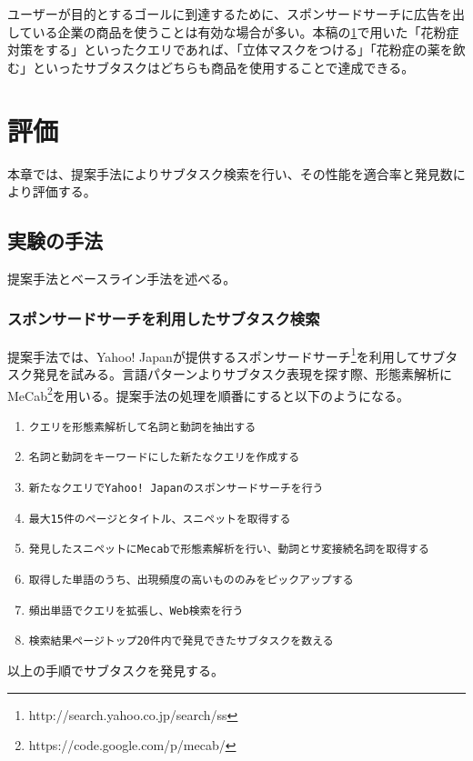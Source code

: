 \documentclass[submit,techreq]{ipsj}
\def\|{\verb|}
\begin{document}
ユーザーが目的とするゴールに到達するために、スポンサードサーチに広告を出している企業の商品を使うことは有効な場合が多い。本稿の\ref{sec:evaluate}で用いた「花粉症対策をする」といったクエリであれば、「立体マスクをつける」「花粉症の薬を飲む」といったサブタスクはどちらも商品を使用することで達成できる。



%5章
\section{評価}
\label{sec:evaluate}
本章では、提案手法によりサブタスク検索を行い、その性能を適合率と発見数により評価する。

%5.1
\subsection{実験の手法}
提案手法とベースライン手法を述べる。

%5.1.1
\subsubsection{スポンサードサーチを利用したサブタスク検索}

提案手法では、Yahoo! Japanが提供するスポンサードサーチ\footnote{http://search.yahoo.co.jp/search/ss}を利用してサブタスク発見を試みる。言語パターンよりサブタスク表現を探す際、形態素解析にMeCab\footnote{https://code.google.com/p/mecab/}を用いる。提案手法の処理を順番にすると以下のようになる。

\begin{enumerate}
\item \|クエリを形態素解析して名詞と動詞を抽出する|
\item \|名詞と動詞をキーワードにした新たなクエリを作成する|
\item \|新たなクエリでYahoo! Japanのスポンサードサーチを行う|
\item \|最大15件のページとタイトル、スニペットを取得する|
\item \|発見したスニペットにMecabで形態素解析を行い、動詞とサ変接続名詞を取得する|
\item \|取得した単語のうち、出現頻度の高いもののみをピックアップする|
\item \|頻出単語でクエリを拡張し、Web検索を行う|
\item \|検索結果ページトップ20件内で発見できたサブタスクを数える|
\end{enumerate}

以上の手順でサブタスクを発見する。
\end{document}
